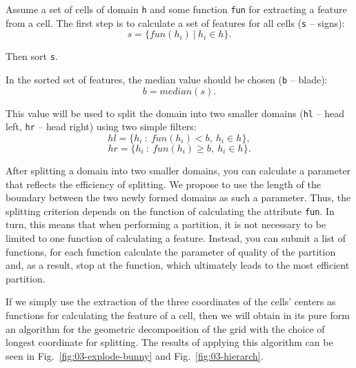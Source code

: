 \documentclass[
11pt,%
tightenlines,%
twoside,%
onecolumn,%
nofloats,%
nobibnotes,%
nofootinbib,%
superscriptaddress,%
noshowpacs,%
centertags]%
{revtex4}
\begin{document}
Assume a set of cells of domain \texttt{h} and some function \texttt{fun} for extracting a feature from a cell.
The first step is to calculate a set of features for all cells (\texttt{s} -- signs):
\begin{equation*}
	s = \{fun(h_i)~|~h_i \in h\}.
\end{equation*}

Then sort \texttt{s}.

In the sorted set of features, the median value should be chosen (\texttt{b} -- blade):
\begin{equation*}
	b = median(s).
\end{equation*}

This value will be used to split the domain into two smaller domains (\texttt{hl} -- head left, \texttt{hr} -- head right) using two simple filters:
\begin{equation*}
	hl = \{h_i~:~fun(h_i) < b,~h_i \in h\},
\end{equation*}
\begin{equation*}
	hr = \{h_i~:~fun(h_i) \geq b,~h_i \in h\}.
\end{equation*}

After splitting a domain into two smaller domains, you can calculate a parameter that reflects the efficiency of splitting.
We propose to use the length of the boundary between the two newly formed domains as such a parameter.
Thus, the splitting criterion depends on the function of calculating the attribute \texttt{fun}.
In turn, this means that when performing a partition, it is not necessary to be limited to one function of calculating a feature.
Instead, you can submit a list of functions, for each function calculate the parameter of quality of the partition and, as a result, stop at the function, which ultimately leads to the most efficient partition.

If we simply use the extraction of the three coordinates of the cells' centers as functions for calculating the feature of a cell, then we will obtain in its pure form an algorithm for the geometric decomposition of the grid with the choice of longest coordinate for splitting.
The results of applying this algorithm can be seen in Fig.~\ref{fig:03-explode-bunny} and Fig.~\ref{fig:03-hierarch}.
\end{document}
